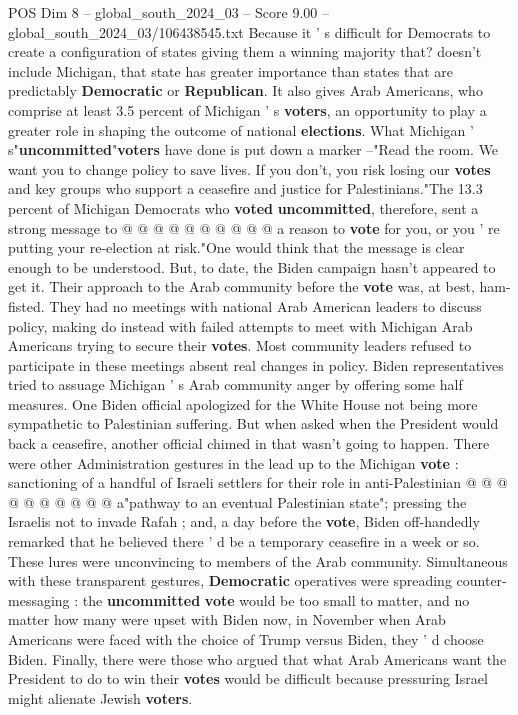 \begin{textsample}{POS Dim 8 – global\_south\_2024\_03 – Score 9.00 – global\_south\_2024\_03/106438545.txt}
Because it ' s difficult for Democrats to create a configuration of states giving them a winning majority that? doesn't include Michigan, that state has greater importance than states that are predictably \textbf{Democratic} or \textbf{Republican}.
It also gives Arab Americans, who comprise at least 3.5 percent of Michigan ' s \textbf{voters}, an opportunity to play a greater role in shaping the outcome of national \textbf{elections}.
What Michigan ' s"\textbf{uncommitted}"\textbf{voters} have done is put down a marker --"Read the room.
We want you to change policy to save lives.
If you don't, you risk losing our \textbf{votes} and key groups who support a ceasefire and justice for Palestinians."The 13.3 percent of Michigan Democrats who \textbf{voted} \textbf{uncommitted}, therefore, sent a strong message to @ @ @ @ @ @ @ @ @ @ a reason to \textbf{vote} for you, or you ' re putting your re-election at risk."One would think that the message is clear enough to be understood.
But, to date, the Biden campaign hasn't appeared to get it.
Their approach to the Arab community before the \textbf{vote} was, at best, ham-fisted.
They had no meetings with national Arab American leaders to discuss policy, making do instead with failed attempts to meet with Michigan Arab Americans trying to secure their \textbf{votes}.
Most community leaders refused to participate in these meetings absent real changes in policy.
Biden representatives tried to assuage Michigan ' s Arab community anger by offering some half measures.
One Biden official apologized for the White House not being more sympathetic to Palestinian suffering.
But when asked when the President would back a ceasefire, another official chimed in that wasn't going to happen.
There were other Administration gestures in the lead up to the Michigan \textbf{vote} : sanctioning of a handful of Israeli settlers for their role in anti-Palestinian @ @ @ @ @ @ @ @ @ @ a"pathway to an eventual Palestinian state"; pressing the Israelis not to invade Rafah ; and, a day before the \textbf{vote}, Biden off-handedly remarked that he believed there ' d be a temporary ceasefire in a week or so.
These lures were unconvincing to members of the Arab community.
Simultaneous with these transparent gestures, \textbf{Democratic} operatives were spreading counter-messaging : the \textbf{uncommitted} \textbf{vote} would be too small to matter, and no matter how many were upset with Biden now, in November when Arab Americans were faced with the choice of Trump versus Biden, they ' d choose Biden.
Finally, there were those who argued that what Arab Americans want the President to do to win their \textbf{votes} would be difficult because pressuring Israel might alienate Jewish \textbf{voters}.

\end{textsample}
